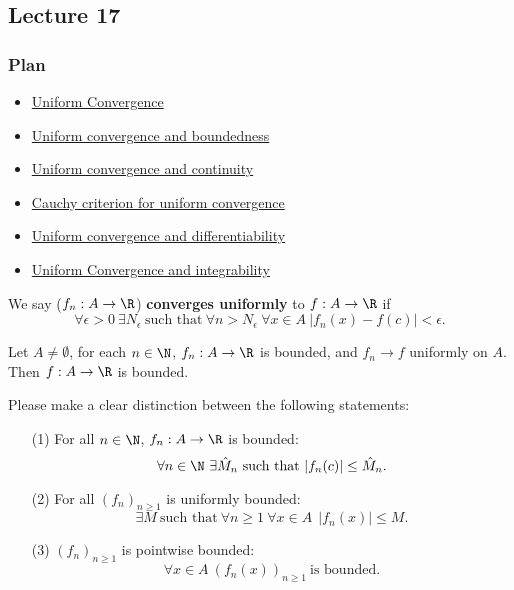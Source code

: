 \subsection{Lecture 17}

\subsubsection{Plan}

\begin{itemize}
    \item {\hyperref[Uniform Convergence]{Uniform Convergence}} 
    \item {\hyperref[Uniform convergence and boundedness]{Uniform convergence and boundedness}} 
    \item {\hyperref[Uniform convergence and continuity]{Uniform convergence and continuity}} 
    \item {\hyperref[Cauchy criterion for uniform convergence]{Cauchy criterion for uniform convergence}} 
    \item {\hyperref[Uniform convergence and differentiability]{Uniform convergence and differentiability}}  
    \item {\hyperref[Uniform Convergence and integrability]{Uniform Convergence and integrability}}  
\end{itemize}


\begin{definition}\label{Uniform Convergence}
    We say (\( {f}_{n} : A \to \R  \)) \textbf{converges uniformly} to \( f: A \to \R  \) if 
    \[  \forall \epsilon > 0 \ \exists {N}_{\epsilon} \ \text{such that} \ \forall n > {N}_{\epsilon} \ \forall x \in A \ | {f}_{n}(x) - f(c) |  < \epsilon. \]
\end{definition}

\begin{theorem}\label{Uniform convergence and boundedness}
    Let \( A \neq \emptyset  \), for each \( n \in \N \), \( {f}_{n}: A \to \R  \) is bounded, and \( {f}_{n} \to f  \) uniformly on \( A  \). Then \( f : A \to \R  \) is bounded.
\end{theorem}

\begin{remark}
    Please make a clear distinction between the following statements:
    \begin{enumerate}
        \item[(1)] For all \( n \in \N \), \( {f}_{n}: A \to \R  \) is bounded:
            \[  \forall n \in \N \ \exists \hat{M}_n \ \text{such that} \ | {f}_{n}(c) |  \leq \hat{M}_n. \]
        \item[(2)] For all \( ({f}_{n})_{n \geq 1 } \) is uniformly bounded:
            \[  \exists M \ \text{such that} \ \forall n \geq 1 \ \forall x \in A \ \ | {f}_{n}(x) |  \leq M.  \]
        \item[(3)] \( ({f}_{n})_{n \geq 1 } \) is pointwise bounded:
            \[ \forall x \in A \ ({f}_{n}(x))_{n \geq 1 } \ \text{is bounded}. \]
    \end{enumerate}
\end{remark}

